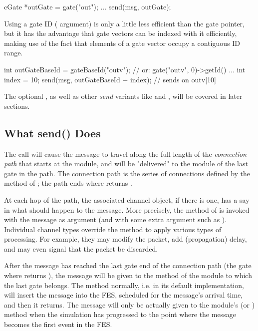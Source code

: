 \begin{ned}
\begin{cpp}
cGate *outGate = gate("out");
...
send(msg, outGate);
\end{cpp}

Using a gate ID ( argument) is only a little less efficient than the
gate pointer, but it has the advantage that gate vectors can be indexed with it
efficiently, making use of the fact that elements of a gate vector occupy a
contiguous ID range.

\begin{cpp}
int outGateBaseId = gateBaseId("outv"); // or: gate("outv", 0)->getId()
...
int index = 10;
send(msg, outGateBaseId + index); // sends on outv[10]
\end{cpp}

The optional , as well as other \textit{send} variants like
 and , will be covered in later sections.

\subsection{What send() Does}
\label{sec:simple-modules:what-send-does}

The  call will cause the message to travel along the full length
of the \textit{connection path} that starts at the module, and will be
"delivered" to the module of the last gate in the path. The connection path is
the series of connections defined by the  method of
; the path ends where  returns .

At each hop of the path, the associated channel object, if there is one, has a
say in what should happen to the message. More precisely, the
 method of  is invoked with the message
as argument (and with some extra argument such as ).
Individual channel types override the  method to apply
various types of processing. For example, they may modify the packet, add
(propagation) delay, and may even signal that the packet be discarded.

After the message has reached the last gate end of the connection path (the gate
where  returns ), the message will be given to
the  method of the module to which the last gate belongs. The
 method normally, i.e. in its default 
implementation, will insert the message into the FES, scheduled for the
message's arrival time, and then it returns. The message will only be actually
given to the module's  (or ) method
when the simulation has progressed to the point where the message becomes the
first event in the FES.


\end{ned}
